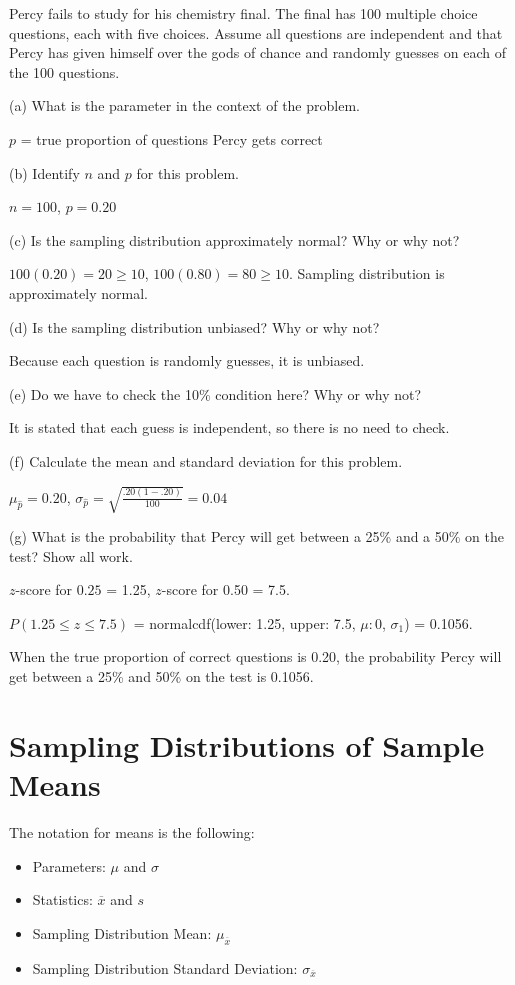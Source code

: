 \documentclass[../stats.tex]{subfiles}
\begin{document}
\begin{example}
    Percy fails to study for his chemistry final. The final has 100 multiple choice questions, each with five choices. Assume all questions are independent and that Percy has given himself over the gods of chance and randomly guesses on each of the 100 questions.

    (a) What is the parameter in the context of the problem.

    $p$ = true proportion of questions Percy gets correct 

    (b) Identify $n$ and $p$ for this problem.

    $n=100$, $p=0.20$

    (c) Is the sampling distribution approximately normal? Why or why not?

    $100(0.20)=20\geq 10$, $100(0.80)=80\geq 10$. Sampling distribution is approximately normal.

    (d) Is the sampling distribution unbiased? Why or why not?

    Because each question is randomly guesses, it is unbiased.

    (e) Do we have to check the 10\% condition here? Why or why not?

    It is stated that each guess is independent, so there is no need to check.

    (f) Calculate the mean and standard deviation for this problem.

    $\mu_{\hat{p}}=0.20$, $\sigma_{\hat{p}}=\sqrt{\frac{.20(1-.20)}{100}}=0.04$

    (g) What is the probability that Percy will get between a 25\% and a 50\% on the test? Show all work.

    $z$-score for $0.25$ = 1.25, $z$-score for 0.50 = 7.5. 

    $P(1.25\leq z\leq 7.5)$ = normalcdf(lower: 1.25, upper: 7.5, $\mu:0$, $\sigma_1$) = 0.1056.

    When the true proportion of correct questions is 0.20, the probability Percy will get between a 25\% and 50\% on the test is 0.1056.
\end{example}


\section{Sampling Distributions of Sample Means}
The notation for means is the following:
\begin{itemize}
    \item Parameters: $\mu$ and $\sigma$
    \item Statistics: $\overline{x}$ and $s$
    \item Sampling Distribution Mean: $\mu_{\overline{x}}$
    \item Sampling Distribution Standard Deviation: $\sigma_{\overline{x}}$
\end{itemize}
\end{document}
